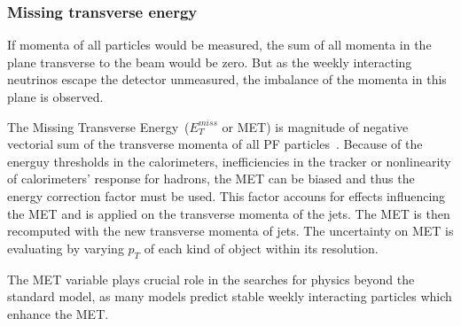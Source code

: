 \subsubsection{Missing transverse energy}


If momenta of all particles would be measured, the sum of all momenta in the plane transverse to the beam would be zero. But as the weekly interacting neutrinos escape the detector unmeasured, the imbalance of the momenta in this plane is observed. 

The Missing Transverse Energy~($E_{T}^{miss}$ or MET) is magnitude of negative vectorial sum of the transverse momenta of all PF particles~\cite{CMS:2016ljj}. Because of the energuy thresholds in the calorimeters, inefficiencies in the tracker or nonlinearity of calorimeters' response for hadrons, the MET can be biased and thus the energy correction factor must be used. This factor accouns for effects influencing the MET and is applied on the transverse momenta of the jets. The MET is then recomputed with the new transverse momenta of jets. The uncertainty on MET is evaluating by varying $p_{T}$ of each kind of object within its resolution. 

The MET variable plays crucial role in the searches for physics beyond the standard model, as many models predict stable weekly interacting particles which enhance the MET.
